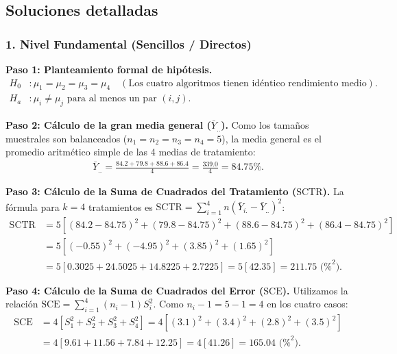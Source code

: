 \subsection{Soluciones detalladas}

\subsubsection*{1. Nivel Fundamental (Sencillos / Directos)}

\begin{solproblema}
	\textbf{Paso 1: Planteamiento formal de hipótesis.}
	\begin{align}
		H_0&: \mu_1 = \mu_2 = \mu_3 = \mu_4 \quad (\text{Los cuatro algoritmos tienen idéntico rendimiento medio}). \\
		H_a&: \mu_i \neq \mu_j \text{ para al menos un par } (i, j).
	\end{align}
	
	\textbf{Paso 2: Cálculo de la gran media general ($\bar{Y}_{..}$).}
	Como los tamaños muestrales son balanceados ($n_1 = n_2 = n_3 = n_4 = 5$), la media general es el promedio aritmético simple de las 4 medias de tratamiento:
	\begin{align}
		\bar{Y}_{..} = \frac{84.2 + 79.8 + 88.6 + 86.4}{4} = \frac{339.0}{4} = 84.75\%.
	\end{align}
	
	\textbf{Paso 3: Cálculo de la Suma de Cuadrados del Tratamiento ($\text{SCTR}$).}
	La fórmula para $k = 4$ tratamientos es $\text{SCTR} = \sum_{i=1}^4 n (\bar{Y}_{i.} - \bar{Y}_{..})^2$:
	\begin{align}
		\text{SCTR} &= 5 \left[ (84.2 - 84.75)^2 + (79.8 - 84.75)^2 + (88.6 - 84.75)^2 + (86.4 - 84.75)^2 \right] \\
		&= 5 \left[ (-0.55)^2 + (-4.95)^2 + (3.85)^2 + (1.65)^2 \right] \\
		&= 5 \left[ 0.3025 + 24.5025 + 14.8225 + 2.7225 \right] = 5 \left[ 42.35 \right] = 211.75 \text{ (\%}^2\text{)}.
	\end{align}
	
	\textbf{Paso 4: Cálculo de la Suma de Cuadrados del Error ($\text{SCE}$).}
	Utilizamos la relación $\text{SCE} = \sum_{i=1}^4 (n_i - 1)S_i^2$. Como $n_i - 1 = 5 - 1 = 4$ en los cuatro casos:
	\begin{align}
		\text{SCE} &= 4 \left[ S_1^2 + S_2^2 + S_3^2 + S_4^2 \right] = 4 \left[ (3.1)^2 + (3.4)^2 + (2.8)^2 + (3.5)^2 \right] \\
		&= 4 \left[ 9.61 + 11.56 + 7.84 + 12.25 \right] = 4 \left[ 41.26 \right] = 165.04 \text{ (\%}^2\text{)}.
	\end{align}
	

\end{solproblema}
